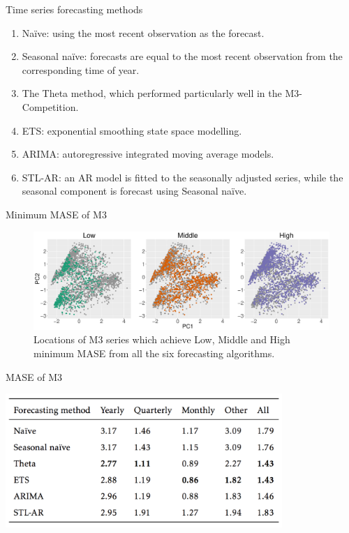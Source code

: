 \documentclass[12pt,ignorenonframetext,compress]{beamer}
\providecommand{\tightlist}{%
\setlength{\itemsep}{0pt}\setlength{\parskip}{0pt}}
\begin{document}
\begin{frame}{Time series forecasting methods}

\begin{enumerate}
\def\labelenumi{\arabic{enumi}.}
\tightlist
\item
  Naïve: using the most recent observation as the forecast.
\item
  Seasonal naïve: forecasts are equal to the most recent observation
  from the corresponding time of year.
\item
  The Theta method, which performed particularly well in the
  M3-Competition.
\item
  ETS: exponential smoothing state space modelling.
\item
  ARIMA: autoregressive integrated moving average models.
\item
  STL-AR: an AR model is fitted to the seasonally adjusted series, while
  the seasonal component is forecast using Seasonal naïve.
\end{enumerate}

\end{frame}

\begin{frame}{Minimum MASE of M3}

\begin{figure}[htbp]
\centering
\includegraphics{figures/minMASE.pdf}
\caption{Locations of M3 series which achieve Low, Middle and High
minimum MASE from all the six forecasting algorithms.}
\end{figure}

\end{frame}

\begin{frame}{MASE of M3}

\centerline{\includegraphics[height=2in]{figures/table1.png}}

\end{frame}
\end{document}
